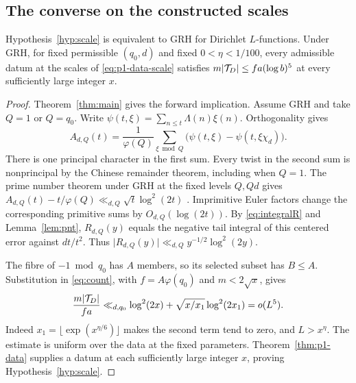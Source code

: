 \subsection{The converse on the constructed scales}
\begin{corollary}\label{cor:scale-equivalence}
Hypothesis~\ref{hyp:scale} is equivalent to GRH for Dirichlet \(L\)-functions.
Under GRH, for fixed permissible \((q_0,d)\) and fixed \(0<\eta<1/100\),
every admissible datum at the scales of \eqref{eq:p1-data-scale} satisfies
\(m|\mathcal T_D|\le fa(\log b)^5\) at every sufficiently large integer \(x\).
\end{corollary}
\begin{proof}
Theorem~\ref{thm:main} gives the forward implication.
Assume GRH and take \(Q=1\) or \(Q=q_0\). Write
\(\psi(t,\xi)=\sum_{n\le t}\Lambda(n)\xi(n)\). Orthogonality gives
\[
 A_{d,Q}(t)=\frac1{\varphi(Q)}
  \sum_{\xi\bmod Q}\bigl(\psi(t,\xi)-\psi(t,\xi\chi_d)\bigr).
\]
There is one principal character in the first sum. Every twist in the
second sum is nonprincipal by the Chinese remainder theorem, including
when \(Q=1\). The prime number theorem under GRH at the fixed levels
\(Q,Qd\) gives \(A_{d,Q}(t)-t/\varphi(Q)\ll_{d,Q}\sqrt{t}\log^2(2t)\)
\cite[Theorem~13.7]{MV}. Imprimitive Euler factors change the corresponding
primitive sums by \(O_{d,Q}(\log(2t))\).
By \eqref{eq:integralR} and Lemma~\ref{lem:pnt}, \(R_{d,Q}(y)\) equals
the negative tail integral of this centered error against \(dt/t^2\).
Thus \(\lvert R_{d,Q}(y)\rvert\ll_{d,Q} y^{-1/2}\log^2(2y)\).

The fibre of $-1\bmod q_0$ has $A$ members, so its selected subset has $B\le A$. Substitution in \eqref{eq:count}, with $f=A\varphi(q_0)$ and $m<2\sqrt{x}$, gives
\[
 \frac{m|\mathcal T_D|}{fa}\ll_{d,q_0}\log^2(2x)
       +\sqrt{x/x_1}\log^2(2x_1)=o(L^5).
\]
Indeed \(x_1=\lfloor\exp(x^{\eta/6})\rfloor\) makes the second term tend
to zero, and \(L>x^\eta\). The estimate is uniform over the data at the
fixed parameters. Theorem~\ref{thm:p1-data} supplies a datum at each
sufficiently large integer \(x\), proving Hypothesis~\ref{hyp:scale}.
\end{proof}
